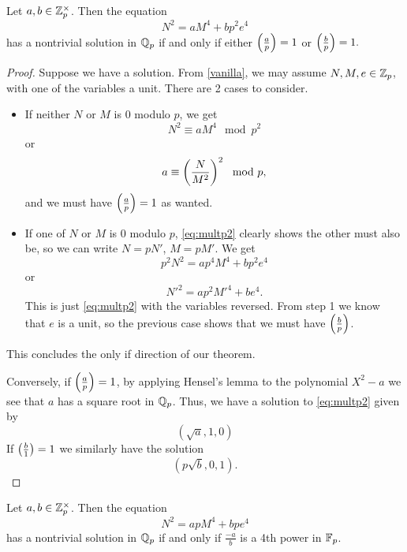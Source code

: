 \documentclass[12pt, a4paper]{amsart}
\begin{document}
\begin{lemma} \label{multp2}
  Let $a, b \in {\mathbb Z}_p^\times$. Then the equation
  \begin{equation}
    \label{eq:multp2}
    N^2 = aM^4 + bp^2e^4
  \end{equation}
  has a nontrivial solution in ${\mathbb Q}_p$ if and only if either $\left(\frac{a}{p}\right) = 1$
  or $\left(\frac{b}{p}\right) = 1.$
\end{lemma}
\begin{proof}
  Suppose we have a solution.
  From \autoref{vanilla}, we may assume $N, M, e \in {\mathbb Z}_p$, with one of the
  variables a unit. There are 2 cases to consider.
  \begin{itemize}
  \item If neither $N$ or $M$ is 0 modulo $p$, we get
    \[N^2 \equiv aM^4 \mod{p^2}\]
    or
    \[a \equiv \left(\frac{N}{M^2}\right)^2 \mod{p},\]
    and we must have $\left(\frac{a}{p}\right) = 1$ as wanted.
  \item If one of $N$ or $M$ is 0 modulo $p$, \autoref{eq:multp2} clearly shows
    the other must also be, so we can write $N = pN'$, $M = pM'$. We get
    \[p^2N^2 = ap^4M^4 + bp^2e^4\]
    or
    \[N'^2 = ap^2M'^4 + be^4.\]
    This is just \autoref{eq:multp2} with the variables reversed. From step
    1 we know that $e$ is a unit, so the previous case shows that we must have
    $\left(\frac{b}{p}\right)$.
  \end{itemize}
  This concludes the only if direction of our theorem.

  Conversely, if $\left(\frac{a}{p}\right) = 1$, by applying Hensel's
  lemma to the polynomial $X^2 - a$ we see that $a$ has a square root in
  ${\mathbb Q}_p$. Thus, we have a solution
  to \autoref{eq:multp2} given by
  \[(\sqrt{a}, 1, 0)\]
  If $\left(\frac{b}{1}\right) = 1$ we similarly have the solution
  \[(p\sqrt{b}, 0, 1).\]
  
\end{proof}

\begin{lemma} \label{multpp}
  Let $a, b \in {\mathbb Z}_p^\times$. Then the equation
  \begin{equation}
    \label{eq:multpp}
    N^2 = apM^4 + bpe^4
  \end{equation}
  has a nontrivial solution in ${\mathbb Q}_p$ if and only if
  $\frac{-a}{b}$ is a 4th power in $\mathbb{F}_p$.
\end{lemma}
\end{document}
